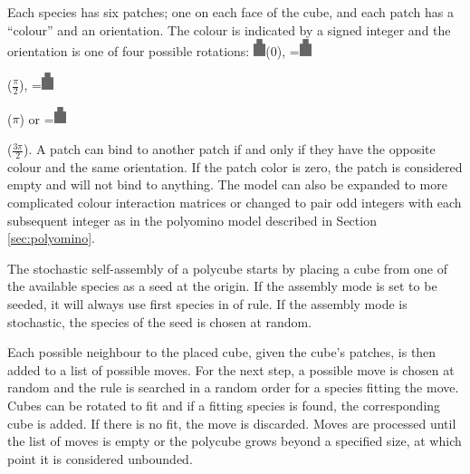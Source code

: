 Each species has six patches; one on each face of the cube, and each patch has a ``colour'' and an orientation. The colour is indicated by a signed integer and the orientation is one of four possible rotations: \includegraphics[width=10pt]{figures/face.eps}\hspace{4pt}(\(0\)),
\begingroup{}=\hbox{\includegraphics[width=10pt,angle=-90]{figures/face.eps}}\parbox{\wd0}{}\endgroup\hspace{4pt}(\(\frac{\pi}{2}\)),
\begingroup{}=\hbox{\includegraphics[width=10pt,angle=180]{figures/face.eps}}\parbox{\wd0}{}\endgroup\hspace{4pt}(\(\pi\)) or
\begingroup{}=\hbox{\includegraphics[width=10pt,angle=90]{figures/face.eps}}\parbox{\wd0}{}\endgroup\hspace{4pt}(\(\frac{3\pi}{2}\)). A patch can bind to another patch if and only if they have the opposite colour and the same orientation. If the patch color is zero, the patch is considered empty and will not bind to anything. The model can also be expanded to more complicated colour interaction matrices or changed to pair odd integers with each subsequent integer as in the polyomino model\cite{ahnert2010self}\cite{johnston2011evolutionary} described in Section \ref{sec:polyomino}.

The stochastic self-assembly of a polycube starts by placing a cube from one of the available species as a seed at the origin. If the assembly mode is set to be seeded, it will always use first species in of rule. If the assembly mode is stochastic, the species of the seed is chosen at random.

Each possible neighbour to the placed cube, given the cube's patches, is then added to a list of possible moves. For the next step, a possible move is chosen at random and the rule is searched in a random order for a species fitting the move. Cubes can be rotated to fit and if a fitting species is found, the corresponding cube is added. If there is no fit, the move is discarded. Moves are processed until the list of moves is empty or the polycube grows beyond a specified size, at which point it is considered unbounded.

